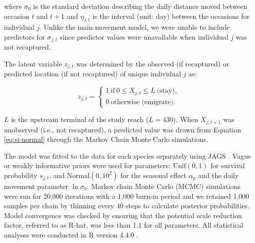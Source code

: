 \documentclass[11pt, class=article, crop=false]{standalone}
\begin{document}
where $\sigma_0$ is the standard deviation describing the daily distance moved between occasion $t$ and $t+1$ and $\eta_{j,t}$ is the interval (unit: day) between the occasions for individual $j$.
Unlike the main movement model, we were unable to include predictors for $\sigma_{j,t}$ since predictor values were unavailable when individual $j$ was not recaptured.

The latent variable $z_{j,t}$ was determined by the observed (if recaptured) or predicted location (if not recaptured) of unique individual $j$ as: 

\begin{equation}
    z_{j,t} =
    \begin{cases}
        1~\text{if}~0 \le X_{j,t} \le L~\text{(stay)},\\
        0~\text{otherwise (emigrate)}.
    \end{cases}
\end{equation}

$L$ is the upstream terminal of the study reach ($L = 430$).
When $X_{j, t+1}$ was unobserved (i.e., not recaptured), a predicted value was drawn from Equation \ref{eq:si-normal} through the Markov Chain Monte Carlo simulations.






The model was fitted to the data for each species separately using JAGS \citep{plummerJAGSProgramAnalysis2003}. Vague or weakly informative priors were used for parameters: $\text{Unif}(0, 1)$ for survival probability $s_{j,t}$, and $\text{Normal}(0, 10^2)$ for the seasonal effect $\alpha_p$ and the daily movement parameter $\ln \sigma_0$. Markov chain Monte Carlo (MCMC) simulations were run for 20,000 iterations with a 1,000 burn-in period and we retained 1,000 samples per chain by thinning every 40 steps to calculate posterior probabilities. Model convergence was checked by ensuring that the potential scale reduction factor, referred to as R-hat, was less than 1.1 for all parameters. All statistical analyses were conducted in R version 4.4.0 \citep{rcoreteamLanguageEnvironmentStatistical2021}. 
\end{document}

